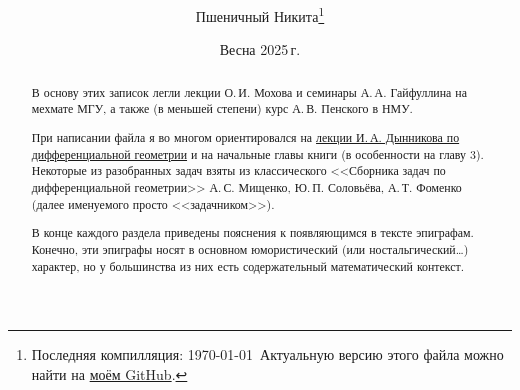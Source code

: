 \documentclass[a4paper, twoside, leqno, 11pt]{article}
\begin{document}
\title{\bfseries\scshape\course}
\date{Весна 2025\,г.}
\author{Пшеничный Никита\thanks{Последняя компилляция: \today\ Актуальную версию этого файла можно найти на \href{https://github.com/pshenikita/Differential-Geometry}{моём GitHub}.}}

\maketitle
\begin{abstract}
	В основу этих записок легли лекции О.\,И. Мохова и семинары А.\,А. Гайфуллина на мехмате МГУ, а также (в меньшей степени) курс А.\,В. Пенского в НМУ.

	При написании файла я во многом ориентировался на \href{https://teach-in.ru/course/classical-difgeom-dynnikov}{лекции И.\,А. Дынникова по дифференциальной геометрии} и на начальные главы книги \cite{NT14} (в особенности на главу 3). Некоторые из разобранных задач взяты из классического <<Сборника задач по дифференциальной геометрии>> А.\,С. Мищенко, Ю.\,П. Соловьёва, А.\,Т. Фоменко (далее именуемого просто <<задачником>>).

	В конце каждого раздела приведены пояснения к появляющимся в тексте эпиграфам. Конечно, эти эпиграфы носят в основном юмористический (или ностальгический\ldots) характер, но у большинства из них есть содержательный математический контекст.

	
\end{abstract}

\tableofcontents








\end{document}
